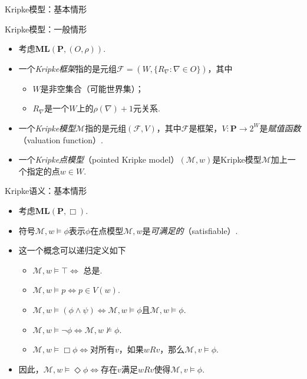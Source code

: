     \begin{frame}{Kripke模型：基本情形}
    \begin{figure}
        \centering
        
    \end{figure}
    \end{frame}
    
    \begin{frame}{Kripke模型：一般情形}
    \begin{itemize}
        \item 考虑$\mathbf{ML}(\mathbf{P},(O,\rho))$.
        \item 一个\emph{Kripke框架}指的是元组$\mathcal F=(W,\{R_\nabla:\nabla\in O\})$，其中
        \begin{itemize}
            \item $W$是非空集合（可能世界集）；
            \item $R_\nabla$是一个$W$上的$\rho(\nabla)+1$元关系.
        \end{itemize}
        \item 一个\emph{Kripke模型}$\mathcal{M}$指的是元组$(\mathcal F,V)$，其中$\mathcal F$是框架，$V:\mathbf P\to 2^W$是\emph{赋值函数}（valuation function）.
        \item 一个\emph{Kripke点模型}（pointed Kripke model）$(\mathcal{M},w)$是Kripke模型$\mathcal M$加上一个指定的点$w\in W$.
    \end{itemize}
    \end{frame}
    
    \begin{frame}{Kripke语义：基本情形}
    \begin{itemize}
        \item 考虑$\mathbf{ML}(\mathbf{P},\Box)$.
        \item 符号$\mathcal M,w\vDash\phi$表示$\phi$在点模型$\mathcal M,w$是\emph{可满足的}（satisfiable）.
        \item 这一个概念可以递归定义如下
        \begin{itemize}
            \item $\mathcal M, w\vDash\top\iff$ 总是.
            \item $\mathcal M, w\vDash p\iff p\in V(w)$.
            \item $\mathcal M, w\vDash (\phi\wedge\psi)\iff\mathcal M,w\vDash\phi$且$\mathcal M,w\vDash\phi$.
            \item $\mathcal M, w\vDash \neg\phi\iff\mathcal M,w\not\vDash\phi$.
            \item $\mathcal M, w\vDash \Box\phi\iff$对所有$v$，如果$wRv$，那么$\mathcal M,v\vDash\phi$.
        \end{itemize}
        \item 因此，$\mathcal M, w\vDash \Diamond\phi\iff$存在$v$满足$wRv$使得$\mathcal M,v\vDash\phi$.
    \end{itemize}
    \end{frame}
    
